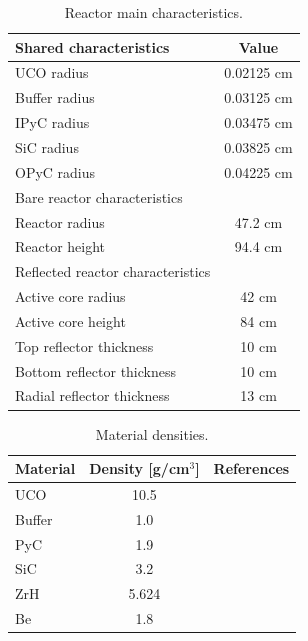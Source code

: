 \documentclass[11pt,letterpaper]{article}
\begin{document}
\begin{table}[htbp!]
	\centering
	\caption{Reactor main characteristics.}
	\label{tab:design}
	\begin{tabular}{@{}l c}
	\toprule
	Shared characteristics		& Value	\\
	\midrule
	UCO radius	        		& 0.02125 cm \cite{oecd_nea_benchmark_2017} \\
	Buffer radius       		& 0.03125 cm \cite{oecd_nea_benchmark_2017} \\
	IPyC radius         		& 0.03475 cm \cite{oecd_nea_benchmark_2017} \\
	SiC radius          		& 0.03825 cm \cite{oecd_nea_benchmark_2017} \\
	OPyC radius         		& 0.04225 cm \cite{oecd_nea_benchmark_2017} \\
	\midrule
	Bare reactor characteristics & \\
	\midrule
	Reactor radius 				& 47.2 cm 	\\
	Reactor height 				& 94.4 cm 	\\ 
	\midrule
	Reflected reactor characteristics & \\
	\midrule
	Active core radius 			& 42 cm 	\\
	Active core height 			& 84 cm 	\\
	Top reflector thickness 	& 10 cm 	\\
	Bottom reflector thickness 	& 10 cm 	\\
	Radial reflector thickness 	& 13 cm 	\\
	\bottomrule
	\end{tabular}
\end{table}

\begin{table}[htbp!]
	\centering
	\caption{Material densities.}
	\label{tab:densities}
	\begin{tabular}{@{}l c c}
	\toprule
	Material   		& Density [g/cm$^3$] & References 	\\
	\midrule
	UCO				& 10.5	& \cite{oecd_nea_benchmark_2017} 	\\
	Buffer			& 1.0	& \cite{oecd_nea_benchmark_2017} 	\\
	PyC				& 1.9	& \cite{oecd_nea_benchmark_2017} 	\\
	SiC				& 3.2	& \cite{oecd_nea_benchmark_2017} 	\\
	ZrH				& 5.624	& \cite{weck_mechanical_2015} 	\\
	Be				& 1.8	& \cite{beeston_beryllium_1970}	\\
	\bottomrule
	\end{tabular}
\end{table}
\end{document}

